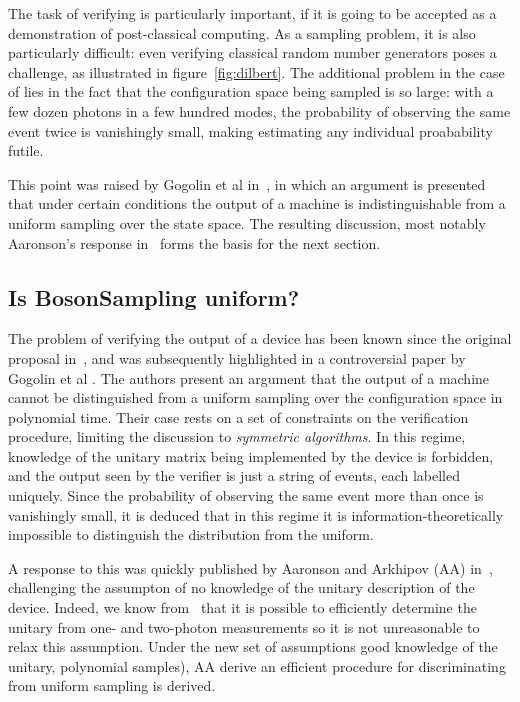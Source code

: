 The task of verifying \bosonsampling{} is particularly important, if it is going
to be accepted as a demonstration of post-classical computing. As a sampling
problem, it is also particularly difficult: even verifying classical random
number generators poses a challenge, as illustrated in figure~\ref{fig:dilbert}.
The additional problem in the case of \bosonsampling{} lies in the fact that the
configuration space being sampled is so large: with a few dozen photons in a few
hundred modes, the probability of observing the same event twice is vanishingly
small, making estimating any individual proabability futile.

This point was raised by Gogolin et al in~\cite{gogolin}, in which an argument
is presented that under certain conditions the output of a \bosonsampling{}
machine is indistinguishable from a uniform sampling over the state space. The
resulting discussion, most notably Aaronson's response in~\cite{notuniform}
forms the basis for the next section.

\subsection{Is BosonSampling uniform?}
\label{sec:RStar}
The problem of verifying the output of a \bosonsampling{} device has been known
since the original proposal in~\cite{bosonsampling}, and was subsequently
highlighted in a controversial paper by Gogolin et al \cite{gogolin}. The
authors present an argument that the output of a \bosonsampling{} machine cannot
be distinguished from a uniform sampling over the configuration space in
polynomial time. Their case rests on a set of constraints on the verification
procedure, limiting the discussion to \emph{symmetric algorithms}. In this
regime, knowledge of the unitary matrix being implemented by the device is
forbidden, and the output seen by the verifier is just a string of events, each
labelled uniquely. Since the probability of observing the same event more than
once is vanishingly small, it is deduced that in this regime it is
information-theoretically impossible to distinguish the \bosonsampling{}
distribution from the uniform.

A response to this was quickly published by Aaronson and Arkhipov (AA)
in~\cite{notuniform}, challenging the assumpton of no knowledge of the unitary
description of the device. Indeed, we know from~\cite{sst} that it is possible
to efficiently determine the unitary from one- and two-photon measurements so it
is not unreasonable to relax this assumption. Under the new set of assumptions 
good knowledge of the unitary, polynomial samples), AA derive an efficient
procedure for discriminating \bosonsampling{} from uniform sampling is derived.

